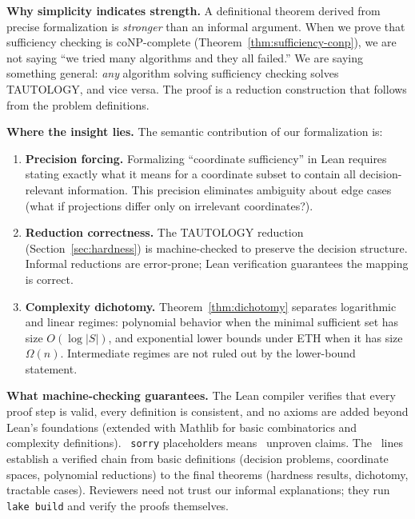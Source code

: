 \textbf{Why simplicity indicates strength.} A definitional theorem derived from precise formalization is \emph{stronger} than an informal argument. When we prove that sufficiency checking is coNP-complete (Theorem~\ref{thm:sufficiency-conp}), we are not saying ``we tried many algorithms and they all failed.'' We are saying something general: \emph{any} algorithm solving sufficiency checking solves TAUTOLOGY, and vice versa. The proof is a reduction construction that follows from the problem definitions.

\textbf{Where the insight lies.} The semantic contribution of our formalization is:

\begin{enumerate}
\item \textbf{Precision forcing.} Formalizing ``coordinate sufficiency'' in Lean requires stating exactly what it means for a coordinate subset to contain all decision-relevant information. This precision eliminates ambiguity about edge cases (what if projections differ only on irrelevant coordinates?).

\item \textbf{Reduction correctness.} The TAUTOLOGY reduction (Section~\ref{sec:hardness}) is machine-checked to preserve the decision structure. Informal reductions are error-prone; Lean verification guarantees the mapping is correct.

\item \textbf{Complexity dichotomy.} Theorem~\ref{thm:dichotomy} separates logarithmic and linear regimes: polynomial behavior when the minimal sufficient set has size $O(\log |S|)$, and exponential lower bounds under ETH when it has size $\Omega(n)$. Intermediate regimes are not ruled out by the lower-bound statement.
\end{enumerate}

\textbf{What machine-checking guarantees.} The Lean compiler verifies that every proof step is valid, every definition is consistent, and no axioms are added beyond Lean's foundations (extended with Mathlib for basic combinatorics and complexity definitions). \LeanTotalSorry\ \texttt{sorry} placeholders means \LeanTotalSorry\ unproven claims. The \LeanTotalLines\ lines establish a verified chain from basic definitions (decision problems, coordinate spaces, polynomial reductions) to the final theorems (hardness results, dichotomy, tractable cases). Reviewers need not trust our informal explanations; they run \texttt{lake build} and verify the proofs themselves.


